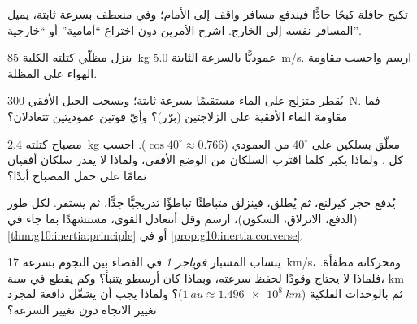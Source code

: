 \begin{exercise}[$\star\star$]\label{exo:g10:inertia:9}
تكبح حافلة كبحًا حادًّا فيندفع مسافر واقف إلى الأمام؛ وفي
منعطف بسرعة ثابتة، يميل المسافر نفسه إلى الخارج. اشرح
الأمرين دون اختراع  ``أمامية'' أو ``خارجية''.
\end{exercise}

\begin{exercise}[$\star\star$]\label{exo:g10:inertia:10}
ينزل مظلّي كتلته الكلية \qty{85}{kg} عموديًّا بالسرعة
الثابتة \qty{5.0}{m/s}. ارسم  واحسب مقاومة
الهواء على المظلة.
\end{exercise}

\begin{exercise}[$\star\star$]\label{exo:g10:inertia:11}
يُقطر متزلج على الماء مستقيمًا بسرعة ثابتة؛ ويسحب الحبل الأفقي
 \qty{300}{N}. فما مقاومة الماء الأفقية على
الزلاجتين (برّر)؟ وأيّ قوتين عموديتين تتعادلان؟
\end{exercise}

\begin{exercise}[$\star\star\star$]\label{exo:g10:inertia:12}
مصباح كتلته \qty{2.4}{kg} معلّق بسلكين على $40^\circ$ من
العمودي ($\cos 40^\circ \approx 0.766$). احسب كل .
ولماذا يكبر  كلما اقترب السلكان من الوضع الأفقي،
ولماذا لا يقدر سلكان أفقيان تمامًا على حمل المصباح أبدًا؟
\end{exercise}

\begin{exercise}[$\star\star\star$]\label{exo:g10:inertia:13}
يُدفع حجر كيرلنغ، ثم يُطلق، فينزلق متباطئًا تباطؤًا
تدريجيًّا جدًّا، ثم يستقر. لكل طور (الدفع، الانزلاق، السكون)، ارسم
 وقل أتتعادل القوى، مستشهدًا
بما جاء في \cref{thm:g10:inertia:principle} أو في \cref{prop:g10:inertia:converse}.
\end{exercise}

\begin{exercise}[$\star\star\star$]\label{exo:g10:inertia:14}
ينساب المسبار \emph{فوياجر 1} في الفضاء بين النجوم بسرعة
\qty{17}{km/s}، ومحركاته مطفأة. فلماذا لا يحتاج وقودًا لحفظ
سرعته، وبماذا كان أرسطو يتنبأ؟ وكم يقطع في
سنة،  \unit{km} ثم بالوحدات الفلكية ($\qty{1}{au} \approx
\qty{1.496e8}{km}$)؟ ولماذا يجب أن يشغّل دافعة لمجرد تغيير
الاتجاه \emph{دون} تغيير السرعة؟
\end{exercise}

